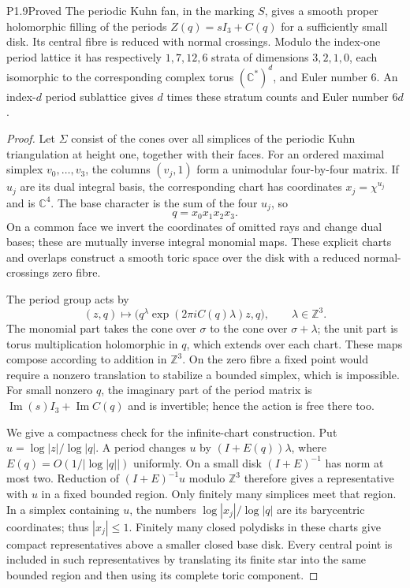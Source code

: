 \begin{statement}{P1.9}{Proved}
The periodic Kuhn fan, in the marking $S$, gives a smooth proper
holomorphic filling of the periods $Z(q)=sI_3+C(q)$ for a sufficiently
small disk.  Its central fibre is reduced with normal crossings.
Modulo the index-one period lattice it has respectively $1,7,12,6$
strata of dimensions $3,2,1,0$, each isomorphic to the corresponding
complex torus $(\mathbb C^*)^d$, and Euler number $6$.
An index-$d$ period sublattice gives $d$ times these stratum counts and
Euler number $6d$.
\end{statement}
\begin{proof}
Let $\Sigma$ consist of the cones over all simplices of the periodic
Kuhn triangulation at height one, together with their faces.  For an
ordered maximal simplex $v_0,\ldots,v_3$, the columns $(v_j,1)$ form a
unimodular four-by-four matrix.  If $u_j$ are its dual integral basis,
the corresponding chart has coordinates $x_j=\chi^{u_j}$ and is
$\mathbb C^4$.  The base character is the sum of the four $u_j$, so
\[
q=x_0x_1x_2x_3.
\]
On a common face we invert the coordinates of omitted rays and change
dual bases; these are mutually inverse integral monomial maps.  These
explicit charts and overlaps construct a smooth toric space over the
disk with a reduced normal-crossings zero fibre.

The period group acts by
\[
(z,q)\longmapsto
\bigl(q^\lambda\exp(2\pi iC(q)\lambda)z,q\bigr),
\qquad \lambda\in\mathbb Z^3.
\]
The monomial part takes the cone over $\sigma$ to the cone over
$\sigma+\lambda$; the unit part is torus multiplication holomorphic in
$q$, which extends over each chart.  These maps compose according to
addition in $\mathbb Z^3$.  On the zero fibre a fixed point would
require a nonzero translation to stabilize a bounded simplex, which
is impossible.  For small nonzero $q$, the imaginary part of the
period matrix is $\operatorname{Im}(s)I_3+\operatorname{Im}C(q)$ and
is invertible; hence the action is free there too.

We give a compactness check for the infinite-chart construction.  Put
$u=\log|z|/\log|q|$.  A period changes $u$ by
$(I+E(q))\lambda$, where $E(q)=O(1/|\log|q||)$ uniformly.
On a small disk $(I+E)^{-1}$ has norm at most two.  Reduction of
$(I+E)^{-1}u$ modulo $\mathbb Z^3$ therefore gives a representative
with $u$ in a fixed bounded region.  Only finitely many simplices
meet that region.  In a simplex containing $u$, the numbers
$\log|x_j|/\log|q|$ are its barycentric coordinates; thus
$|x_j|\leq1$.  Finitely many closed polydisks in these charts give
compact representatives above a smaller closed base disk.  Every
central point is included in such representatives by translating its
finite star into the same bounded region and then using its complete
toric component.


\end{proof}
